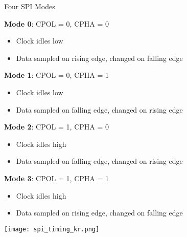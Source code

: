 \begin{concept}{Four SPI Modes}

\begin{minipage}{0.5\linewidth}
\textbf{Mode 0}: CPOL = 0, CPHA = 0
    \begin{itemize}
        \item Clock idles low
        \item Data sampled on rising edge, changed on falling edge
    \end{itemize}
\textbf{Mode 1}: CPOL = 0, CPHA = 1
    \begin{itemize}
        \item Clock idles low
        \item Data sampled on falling edge, changed on rising edge
    \end{itemize}
\end{minipage}
\begin{minipage}{0.5\linewidth}
\textbf{Mode 2}: CPOL = 1, CPHA = 0
    \begin{itemize}
        \item Clock idles high
        \item Data sampled on falling edge, changed on rising edge
    \end{itemize}
\textbf{Mode 3}: CPOL = 1, CPHA = 1
    \begin{itemize}
        \item Clock idles high
        \item Data sampled on rising edge, changed on falling edge
    \end{itemize}
\end{minipage}
\end{concept}

\begin{center}
\texttt{[image: spi\_timing\_kr.png]}
\end{center}


